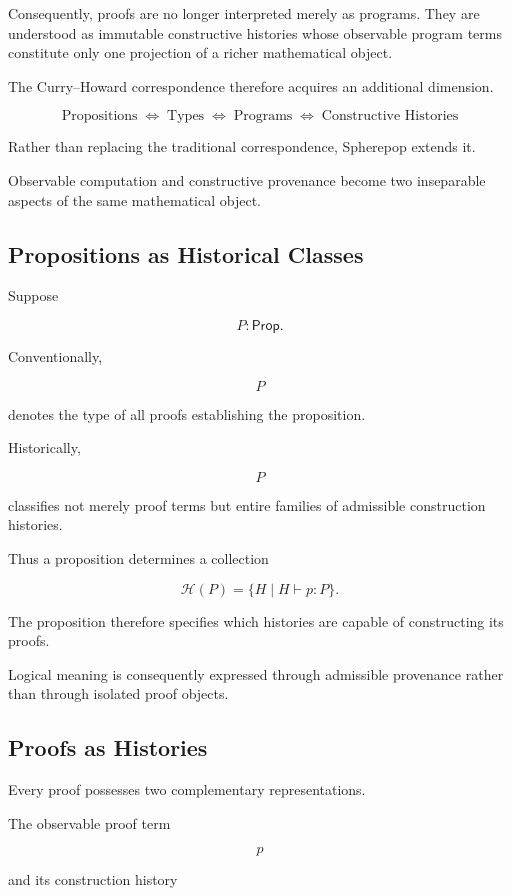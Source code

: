 \documentclass[12pt,oneside]{article}
\theoremstyle{definition}
\theoremstyle{remark}
\newcommand{\Prop}{\mathsf{Prop}}
\begin{document}
Consequently, proofs are no longer interpreted merely as programs. They are
understood as immutable constructive histories whose observable program terms
constitute only one projection of a richer mathematical object.

The Curry--Howard correspondence therefore acquires an additional dimension.

\[
\boxed{
\text{Propositions}
\;\Longleftrightarrow\;
\text{Types}
\;\Longleftrightarrow\;
\text{Programs}
\;\Longleftrightarrow\;
\text{Constructive Histories}
}
\]

Rather than replacing the traditional correspondence, Spherepop extends it.

Observable computation and constructive provenance become two inseparable
aspects of the same mathematical object.

\subsection{Propositions as Historical Classes}

Suppose

\[
P : \Prop.
\]

Conventionally,

\[
P
\]

denotes the type of all proofs establishing the proposition.

Historically,

\[
P
\]

classifies not merely proof terms but entire families of admissible
construction histories.

Thus a proposition determines a collection

\[
\mathcal{H}(P)
=
\{
H
\mid
H
\vdash
p:P
\}.
\]

The proposition therefore specifies which histories are capable of constructing
its proofs.

Logical meaning is consequently expressed through admissible provenance rather
than through isolated proof objects.

\subsection{Proofs as Histories}

Every proof possesses two complementary representations.

The observable proof term

\[
p
\]

and its construction history
\end{document}
